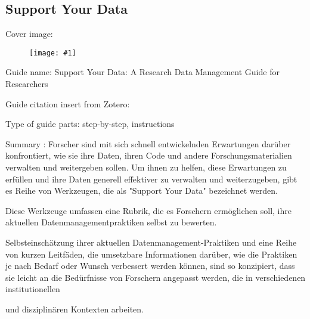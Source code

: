 \documentclass{article}
\newlength{\imgwidth}
\newcommand\scaledgraphics[2]{%
                
\settowidth{\imgwidth}{\texttt{[image: \#1]}}%
                
\setlength{\imgwidth}{\minof{\imgwidth}{#2\textwidth}}%
                
\texttt{[image: \#1]}%
                
}
\begin{document}
\subsection{Support Your Data}\label{H715180}



Cover image: 


\begin{center}
\begin{figure}
\scaledgraphics{45bdf5de-7e5b-448d-820a-d3b3288a4dbe.png}{0.5}
\label{F88206441}
\end{figure}


\end{center}


Guide name: Support Your Data: A Research Data Management Guide for Researchers


Guide citation insert from Zotero: \autocite{borghi_support_2018}


Type of guide parts: step-by-step, instructions


Summary : Forscher sind mit sich schnell entwickelnden Erwartungen darüber konfrontiert, wie sie ihre Daten, ihren Code und andere Forschungsmaterialien verwalten und weitergeben sollen. Um ihnen zu helfen, diese Erwartungen zu erfüllen und ihre Daten generell effektiver zu verwalten und weiterzugeben, gibt es Reihe von Werkzeugen, die als "Support Your Data" bezeichnet werden.


Diese Werkzeuge umfassen eine Rubrik, die es Forschern ermöglichen soll, ihre aktuellen Datenmanagementpraktiken selbst zu bewerten.


Selbsteinschätzung ihrer aktuellen Datenmanagement-Praktiken und eine Reihe von kurzen Leitfäden, die umsetzbare Informationen darüber, wie die Praktiken je nach Bedarf oder Wunsch verbessert werden können, sind so konzipiert, dass sie leicht an die Bedürfnisse von Forschern angepasst werden, die in verschiedenen institutionellen


und disziplinären Kontexten arbeiten.











\printbibliography[title={Literaturverzeichnis}]
\end{document}
